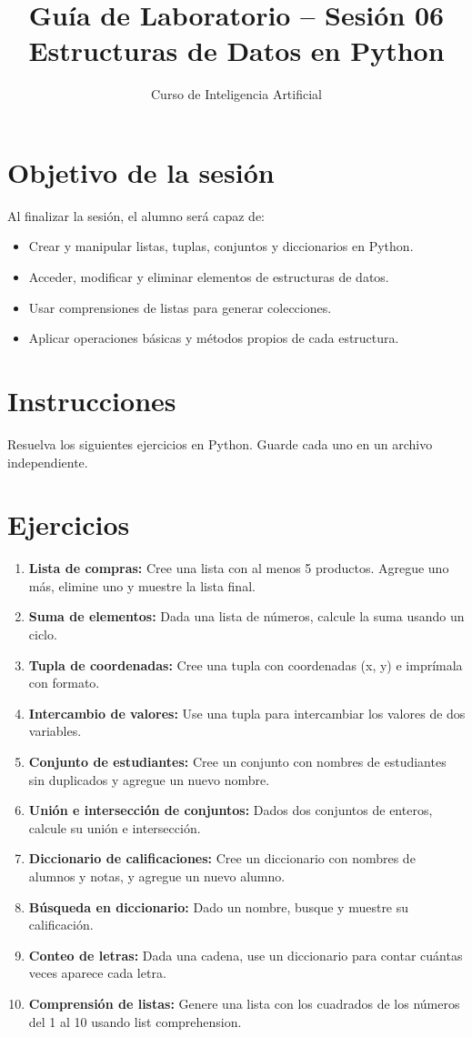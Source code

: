 \documentclass[12pt,a4paper]{article}
\title{\textbf{Guía de Laboratorio – Sesión 06} \\ Estructuras de Datos en Python}
\author{Curso de Inteligencia Artificial}
\date{}
\begin{document}
\maketitle

\section*{Objetivo de la sesión}
Al finalizar la sesión, el alumno será capaz de:
\begin{itemize}
    \item Crear y manipular listas, tuplas, conjuntos y diccionarios en Python.
    \item Acceder, modificar y eliminar elementos de estructuras de datos.
    \item Usar comprensiones de listas para generar colecciones.
    \item Aplicar operaciones básicas y métodos propios de cada estructura.
\end{itemize}

\section*{Instrucciones}
Resuelva los siguientes ejercicios en Python. Guarde cada uno en un archivo independiente.

\section*{Ejercicios}
\begin{enumerate}[label=\textbf{Ejercicio \arabic*:}, leftmargin=1.5cm]
    \item \textbf{Lista de compras:} Cree una lista con al menos 5 productos. Agregue uno más, elimine uno y muestre la lista final.
    \item \textbf{Suma de elementos:} Dada una lista de números, calcule la suma usando un ciclo.
    \item \textbf{Tupla de coordenadas:} Cree una tupla con coordenadas (x, y) e imprímala con formato.
    \item \textbf{Intercambio de valores:} Use una tupla para intercambiar los valores de dos variables.
    \item \textbf{Conjunto de estudiantes:} Cree un conjunto con nombres de estudiantes sin duplicados y agregue un nuevo nombre.
    \item \textbf{Unión e intersección de conjuntos:} Dados dos conjuntos de enteros, calcule su unión e intersección.
    \item \textbf{Diccionario de calificaciones:} Cree un diccionario con nombres de alumnos y notas, y agregue un nuevo alumno.
    \item \textbf{Búsqueda en diccionario:} Dado un nombre, busque y muestre su calificación.
    \item \textbf{Conteo de letras:} Dada una cadena, use un diccionario para contar cuántas veces aparece cada letra.
    \item \textbf{Comprensión de listas:} Genere una lista con los cuadrados de los números del 1 al 10 usando list comprehension.
\end{enumerate}
\end{document}
